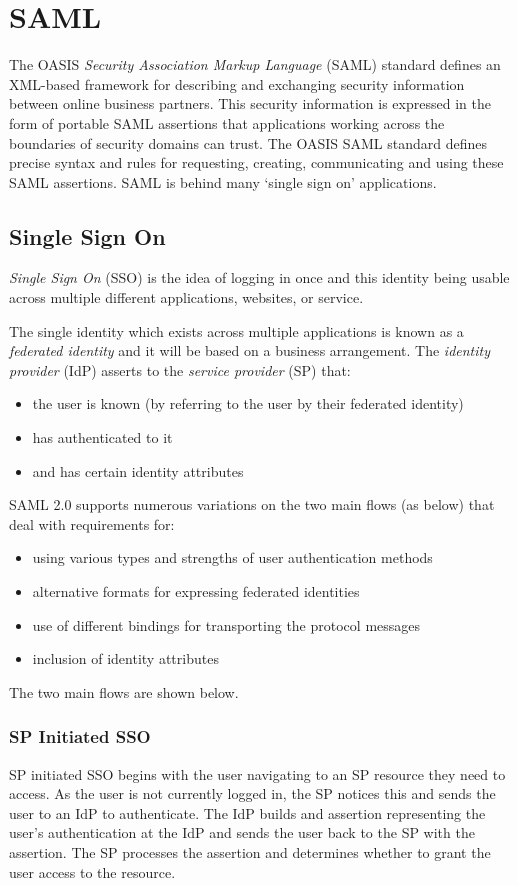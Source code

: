 \section{SAML}
The OASIS \textit{Security Association Markup Language} (SAML) standard defines an XML-based framework for describing and exchanging security information between online business partners. This security information is expressed in the form of portable SAML assertions that applications working across the boundaries of security domains can trust. The OASIS SAML standard defines precise syntax and rules for requesting, creating, communicating and using these SAML assertions. SAML is behind many `single sign on' applications.

\subsection{Single Sign On}
\textit{Single Sign On} (SSO) is the idea of logging in once and this identity being usable across multiple different applications, websites, or service. 

The single identity which exists across multiple applications is known as a \textit{federated identity} and it will be based on a business arrangement. The \textit{identity provider} (IdP) asserts to the \textit{service provider} (SP) that:
\begin{itemize}
    \item the user is known (by referring to the user by their federated identity)
    \item has authenticated to it
    \item and has certain identity attributes
\end{itemize}

SAML 2.0 supports numerous variations on the two main flows (as below) that deal with requirements for:
\begin{itemize}
    \item using various types and strengths of user authentication methods
    \item alternative formats for expressing federated identities
    \item use of different bindings for transporting the protocol messages
    \item inclusion of identity attributes
\end{itemize}

The two main flows are shown below.

\subsubsection{SP Initiated SSO}
SP initiated SSO begins with the user navigating to an SP resource they need to access. As the user is not currently logged in, the SP notices this and sends the user to an IdP to authenticate. The IdP builds and assertion representing the user's authentication at the IdP and sends the user back to the SP with the assertion. The SP processes the assertion and determines whether to grant the user access to the resource.

